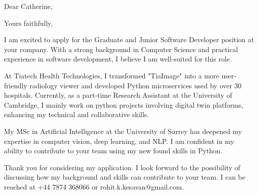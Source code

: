 \date{June 27, 2024}
\opening{Dear Catherine,}
\closing{Yours faithfully,}
\makelettertitle

I am excited to apply for the Graduate and Junior Software Developer position at your company. With a strong background in Computer Science and practical experience in software development, I believe I am well-suited for this role.

At Tiatech Health Technologies, I transformed "TiaImage" into a more user-friendly radiology viewer and developed Python microservices used by over 30 hospitals. Currently, as a part-time Research Assistant at the University of Cambridge, I mainly work on python projects involving digital twin platforms, enhancing my technical and collaborative skills.

My MSc in Artificial Intelligence at the University of Surrey has deepened my expertise in computer vision, deep learning, and NLP. I am confident in my ability to contribute to your team using my new found skills in Python.

Thank you for considering my application. I look forward to the possibility of discussing how my background and skills can contribute to your team. I can be reached at +44 7874 368066 or rohit.k.kesavan@gmail.com.

\makeletterclosing
